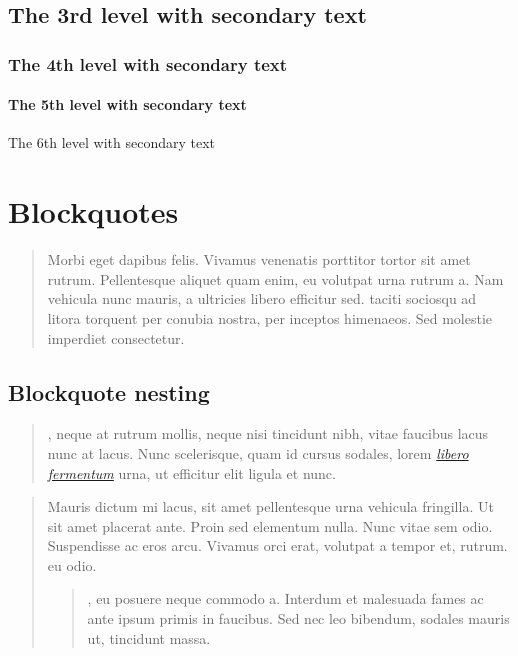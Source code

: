 \documentclass[letterpaper,10pt,english]{sphinxmanual}
\begin{document}
\subsection{The 3rd level with secondary text}
\label{\detokenize{specimen:the-3rd-level-with-secondary-text}}

\subsubsection{The 4th level with secondary text}
\label{\detokenize{specimen:the-4th-level-with-secondary-text}}

\paragraph{The 5th level with secondary text}
\label{\detokenize{specimen:the-5th-level-with-secondary-text}}
The 6th level with secondary text


\section{Blockquotes}
\label{\detokenize{specimen:blockquotes}}\begin{quote}

Morbi eget dapibus felis. Vivamus venenatis porttitor tortor sit amet
rutrum. Pellentesque aliquet quam enim, eu volutpat urna rutrum a.
Nam vehicula nunc mauris, a ultricies libero efficitur sed.  taciti sociosqu ad litora torquent per conubia nostra, per
inceptos himenaeos. Sed molestie imperdiet consectetur.
\end{quote}


\subsection{Blockquote nesting}
\label{\detokenize{specimen:blockquote-nesting}}\begin{quote}

, neque at rutrum mollis, neque nisi tincidunt nibh,
vitae faucibus lacus nunc at lacus. Nunc scelerisque, quam id cursus
sodales, lorem {\hyperref[\detokenize{specimen:}]{\emph{libero fermentum}}} urna, ut efficitur elit
ligula et nunc.
\end{quote}
\begin{quote}

Mauris dictum mi lacus, sit amet pellentesque urna vehicula
fringilla. Ut sit amet placerat ante. Proin sed elementum nulla.
Nunc vitae sem odio. Suspendisse ac eros arcu. Vivamus orci erat,
volutpat a tempor et, rutrum. eu odio.
\begin{quote}

, eu posuere neque
commodo a. Interdum et malesuada fames ac ante ipsum primis in
faucibus. Sed nec leo bibendum, sodales mauris ut, tincidunt
massa.
\end{quote}
\end{quote}
\end{document}
